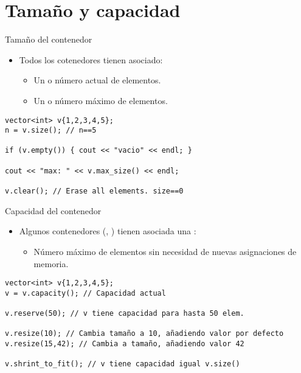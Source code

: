 \section{Tamaño y capacidad}

\begin{frame}[t,fragile]{Tamaño del contenedor}
\begin{itemize}
  \item Todos los cotenedores tienen asociado:
    \begin{itemize}
      \item Un  o número actual de elementos.
      \item Un  o número máximo de elementos.
    \end{itemize}
\end{itemize}
\vfill
\begin{lstlisting}
vector<int> v{1,2,3,4,5};
n = v.size(); // n==5

if (v.empty()) { cout << "vacio" << endl; }

cout << "max: " << v.max_size() << endl;

v.clear(); // Erase all elements. size==0
\end{lstlisting}
\end{frame}

\begin{frame}[t,fragile]{Capacidad del contenedor}
\begin{itemize}
  \item Algunos contenedores (, ) tienen asociada una :
    \begin{itemize}
      \item Número máximo de elementos sin necesidad de nuevas asignaciones de memoria.
    \end{itemize}
\end{itemize}
\begin{lstlisting}
vector<int> v{1,2,3,4,5};
v = v.capacity(); // Capacidad actual

v.reserve(50); // v tiene capacidad para hasta 50 elem.

v.resize(10); // Cambia tamaño a 10, añadiendo valor por defecto
v.resize(15,42); // Cambia a tamaño, añadiendo valor 42

v.shrint_to_fit(); // v tiene capacidad igual v.size()
\end{lstlisting}
\end{frame}
